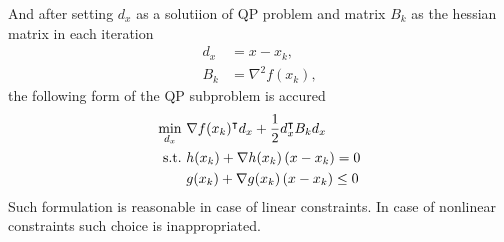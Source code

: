 And after setting $d_x$ as a solutiion of QP problem and matrix $B_k$ as the hessian matrix in each iteration
\begin{subequations}
	\begin{align}
		d_x&=x-x_k,\\
		B_k &= \nabla^2f(x_k),
	\end{align}
\end{subequations}
the following form of the QP subproblem is accured
\begin{subequations}
	\begin{align}
		\min_{d_x}\  &\nabla f(x_k)^\intercal d_x+\frac{1}{2}d_x^\intercal B_k d_x\\
		\text{s.t.}\  &h(x_k)+\nabla h(x_k)\left( x-x_k \right) = 0\\
		&g(x_k)+\nabla g(x_k)\left( x-x_k \right)\leq 0
	\end{align}
\end{subequations}
Such formulation is reasonable in case of linear constraints. In case of nonlinear constraints such choice is inappropriated. 

